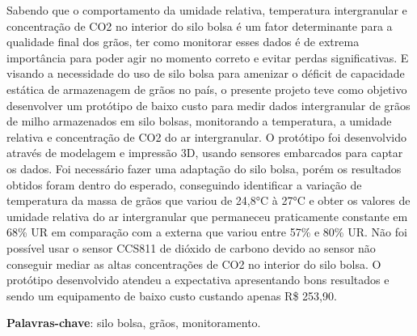 \setlength{\absparsep}{18pt} %
\begin{resumo}
 
Sabendo que o comportamento da umidade relativa, temperatura intergranular e concentração de CO2 no interior do silo bolsa é um fator determinante para a qualidade final dos grãos, ter como monitorar esses dados é de extrema importância para poder agir no momento correto e evitar perdas significativas. E visando a necessidade do uso de silo bolsa para amenizar o déficit de capacidade estática de armazenagem de grãos no país, o presente projeto teve como objetivo desenvolver um protótipo de baixo custo para medir dados intergranular de grãos de milho armazenados em silo bolsas, monitorando a temperatura, a umidade relativa e concentração de CO2 do ar intergranular. O protótipo foi desenvolvido através de modelagem e impressão 3D, usando sensores embarcados para captar os dados. Foi necessário fazer uma adaptação do silo bolsa, porém os resultados obtidos foram dentro do esperado, conseguindo identificar a variação de temperatura da massa de grãos que variou de 24,8°C à 27°C e obter os valores de umidade relativa do ar intergranular que permaneceu praticamente constante em 68\% UR em comparação com a externa que variou entre 57\% e 80\% UR. Não foi possível usar o sensor CCS811 de dióxido de carbono devido ao sensor não conseguir mediar as altas concentrações de CO2 no interior do silo bolsa. O protótipo desenvolvido atendeu a expectativa apresentando bons resultados e sendo um equipamento de baixo custo custando apenas R\$ 253,90.

 \textbf{Palavras-chave}: silo bolsa, grãos, monitoramento.
\end{resumo}